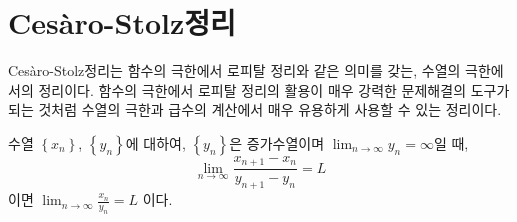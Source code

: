 \documentclass[11pt, a4paper]{book}
\begin{document}
	\chapter{\Huge Ces\`{a}ro-Stolz정리}
	\pagestyle{fancy}
	 \setcounter{page}{1} 
Ces\`{a}ro-Stolz정리는 함수의 극한에서 로피탈 정리와 같은 의미를 갖는, 수열의 극한에서의 정리이다. 함수의 극한에서 로피탈 정리의 활용이 매우 강력한 문제해결의 도구가 되는 것처럼 수열의 극한과 급수의 계산에서 매우 유용하게 사용할 수 있는 정리이다. 
\vspace{1em}
\begin{theorem} 수열 $\left\{x_{n}\right\}$, $\left\{y_{n}\right\}$에 대하여, $\left\{y_{n}\right\}$은 증가수열이며 $\displaystyle \lim_{n\to\infty}y_{n}=\infty$일 때,
\begin{equation*}
	\lim_{n\to\infty}\frac{x_{n+1}-x_{n}}{y_{n+1}-y_{n}}=L
\end{equation*}
이면 $\displaystyle \lim_{n\to\infty}\frac{x_{n}}{y_{n}}=L$ 이다.
\end{theorem}
\end{document}
